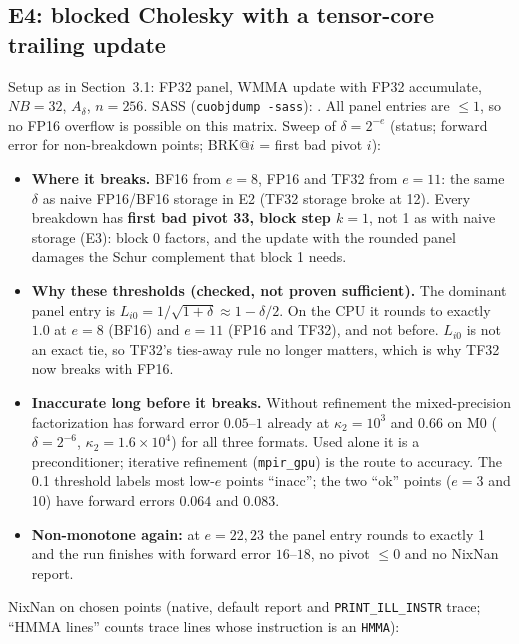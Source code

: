 \documentclass[11pt,a4paper]{article}
\begin{document}
\subsection{E4: blocked Cholesky with a tensor-core trailing update}\label{sec:e4}

Setup as in Section~3.1: FP32 panel, WMMA update with FP32 accumulate, $NB=32$, $A_\delta$, $n=256$. SASS (\texttt{cuobjdump -sass}): . All panel entries are $\le1$, so no FP16 overflow is possible on this matrix.
Sweep of $\delta=2^{-e}$ (status; forward error for non-breakdown points; BRK@$i$ = first bad pivot $i$):

\begin{center}\scriptsize\end{center}

\begin{itemize}
  \item \textbf{Where it breaks.} BF16 from $e=8$, FP16 and TF32 from $e=11$: the same $\delta$ as naive FP16/BF16 storage in E2 (TF32 storage broke at 12). Every breakdown has \textbf{first bad pivot 33, block step $k=1$},
  not 1 as with naive storage (E3): block 0 factors, and the update with the rounded panel damages the Schur complement that block 1 needs.
  \item \textbf{Why these thresholds (checked, not proven sufficient).} The dominant panel entry is $L_{i0}=1/\sqrt{1+\delta}\approx1-\delta/2$. On the CPU it rounds to exactly $1.0$ at $e=8$ (BF16) and $e=11$ (FP16 and TF32), and not before.
  $L_{i0}$ is not an exact tie, so TF32's ties-away rule no longer matters, which is why TF32 now breaks with FP16.
  \item \textbf{Inaccurate long before it breaks.} Without refinement the mixed-precision factorization has forward error $0.05$--$1$ already at $\kappa_2=10^{3}$ and $0.66$ on M0 ($\delta=2^{-6}$, $\kappa_2=1.6\times10^{4}$) for all three formats.
  Used alone it is a preconditioner; iterative refinement (\texttt{mpir\_gpu}) is the route to accuracy. The 0.1 threshold labels most low-$e$ points ``inacc''; the two ``ok'' points ($e=3$ and 10) have forward errors $0.064$ and $0.083$.
  \item \textbf{Non-monotone again:} at $e=22,23$ the panel entry rounds to exactly 1 and the run finishes with forward error $16$--$18$, no pivot $\le0$ and no NixNan report.
\end{itemize}

NixNan on chosen points (native, default report and \texttt{PRINT\_ILL\_INSTR} trace; ``HMMA lines'' counts trace lines whose instruction is an \texttt{HMMA}):
\end{document}
